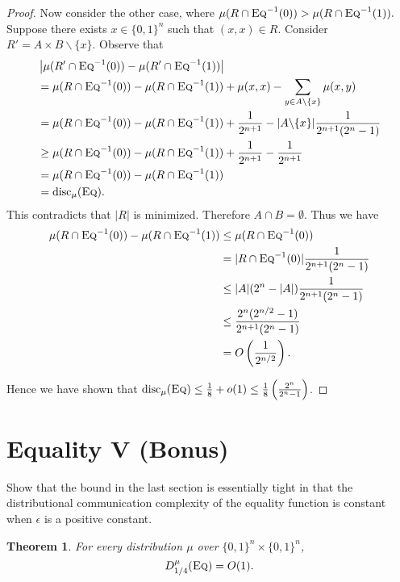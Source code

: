 \documentclass[11pt]{amsart}
\theoremstyle{plain}
\newtheorem{theorem}{Theorem}
\theoremstyle{definition}
\theoremstyle{plain}
\newcommand{\disc}{\mathrm{disc}}
\newcommand{\Eq}{\textsc{Eq}}
\begin{document}
\begin{proof}
    Now consider the other case, where $\mu(R\cap \Eq^{-1}(0)) > \mu(R\cap \Eq^{-1}(1)).$ Suppose there exists $x \in \{0,1\}^n$ such that $(x,x) \in R.$ Consider $R' = A\times B\backslash\{x\}.$ Observe that
    \begin{align*}
        &\left|\mu(R'\cap \Eq^{-1}(0)) - \mu(R'\cap \Eq^{-1}(1))\right|\\ & = \mu(R\cap \Eq^{-1}(0))-\mu(R\cap \Eq^{-1}(1))  + \mu(x,x)- \sum_{y\in A\backslash\{x\}} \mu(x,y)\\
        &= \mu(R\cap \Eq^{-1}(0))-\mu(R\cap \Eq^{-1}(1)) + \frac{1}{2^{n+1}} - |A\backslash\{x\}|\frac{1}{2^{n+1}(2^n-1)} \\
        &\geq \mu(R\cap \Eq^{-1}(0))-\mu(R\cap \Eq^{-1}(1)) + \frac{1}{2^{n+1}} - \frac{1}{2^{n+1}} \\
        &= \mu(R\cap \Eq^{-1}(0))-\mu(R\cap \Eq^{-1}(1))\\
        &= \disc_\mu(\Eq).
    \end{align*}
    This contradicts that $|R|$ is minimized. Therefore $A\cap B = \emptyset$. Thus we have
    \begin{align*}
        \mu(R\cap \Eq^{-1}(0))-\mu(R\cap \Eq^{-1}(1)) &\leq \mu(R\cap \Eq^{-1}(0))\\
        &= |R\cap \Eq^{-1}(0)|\frac{1}{2^{n+1}(2^n-1)} \\
        &\leq |A|(2^n-|A|)\frac{1}{2^{n+1}(2^n-1)}\\
        &\leq \frac{2^{n}(2^{n/2}-1)}{2^{n+1}(2^n-1)}\\
        &= O\left(\frac{1}{2^{n/2}}\right).
    \end{align*}

    Hence we have shown that $\disc_\mu(\Eq) \leq \frac{1}{8} + o(1) \leq \frac{1}{8}\left(\frac{2^n}{2^n-1}\right)$.
\end{proof}



\newpage \section{Equality V (Bonus)}

Show that the bound in the last section is essentially tight in that the distributional communication complexity of the equality function is constant when $\epsilon$ is a positive constant.

\begin{theorem}
For every distribution $\mu$ over $\{0,1\}^n \times \{0,1\}^n$,
\[
D^\mu_{1/4}(\Eq) = O(1).
\]
\end{theorem}
\end{document}
